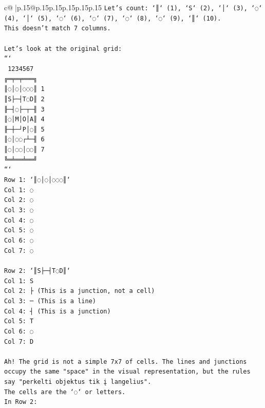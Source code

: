 \documentclass{article}
\begin{document}
{\begin{supertabular}{c@{$\;$}|p{.15\linewidth}@{}p{.15\linewidth}p{.15\linewidth}p{.15\linewidth}p{.15\linewidth}p{.15\linewidth}}
{{{\texttt{Let's count: `║` (1), `S` (2), `│` (3), `◌` (4), `│` (5), `◌` (6), `◌` (7), `◌` (8), `◌` (9), `║` (10).} \\
\texttt{This doesn't match 7 columns.} \\
\\ 
\texttt{Let's look at the original grid:} \\
\texttt{```} \\
\texttt{ 1234567} \\
\texttt{╔═╤═╤═══╗} \\
\texttt{║◌│◌│◌◌◌║ 1} \\
\texttt{║S├─┤T◌D║ 2} \\
\texttt{╟─┤◌├─┬─╢ 3} \\
\texttt{║◌│M│O│A║ 4} \\
\texttt{╟─┼─┘P│◌║ 5} \\
\texttt{║◌│◌◌┌┴─╢ 6} \\
\texttt{║◌│◌◌│◌◌║ 7} \\
\texttt{╚═╧══╧══╝} \\
\texttt{```} \\
\texttt{Row 1: `║◌│◌│◌◌◌║`} \\
\texttt{Col 1: ◌} \\
\texttt{Col 2: ◌} \\
\texttt{Col 3: ◌} \\
\texttt{Col 4: ◌} \\
\texttt{Col 5: ◌} \\
\texttt{Col 6: ◌} \\
\texttt{Col 7: ◌} \\
\\ 
\texttt{Row 2: `║S├─┤T◌D║`} \\
\texttt{Col 1: S} \\
\texttt{Col 2: ├ (This is a junction, not a cell)} \\
\texttt{Col 3: ─ (This is a line)} \\
\texttt{Col 4: ┤ (This is a junction)} \\
\texttt{Col 5: T} \\
\texttt{Col 6: ◌} \\
\texttt{Col 7: D} \\
\\ 
\texttt{Ah! The grid is not a simple 7x7 of cells. The lines and junctions occupy the same "space" in the visual representation, but the rules say "perkelti objektus tik į langelius".} \\
\texttt{The cells are the `◌` or letters.} \\
\texttt{In Row 2:} \\
}}}
\end{supertabular}}
\end{document}

